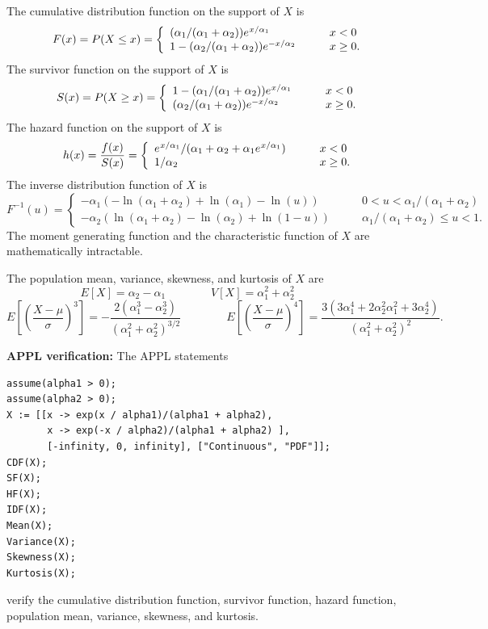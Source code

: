 \documentclass[12pt,fullpage]{article}
\begin{document}
\noindent
The cumulative distribution function on
the support of $X$ is
$$
F(x) = P (X \leq x) = \left\{ \begin{array}{ll}
(\alpha_1/(\alpha_1 + \alpha_2))e^{\kern 0.04em x/\alpha_1} & \qquad x < 0 \\
1 - (\alpha_2/(\alpha_1 + \alpha_2))e^{-x/\alpha_2} & \qquad x \geq 0.
\end{array}
\right.
$$
The survivor function on the support of $X$ is
$$
S(x) = P (X \geq x) = \left\{ \begin{array}{ll}
1 - (\alpha_1/(\alpha_1 + \alpha_2))e^{\kern 0.04em x/\alpha_1} & \qquad x < 0 \\
(\alpha_2/(\alpha_1 + \alpha_2))e^{-x/\alpha_2} & \qquad x \geq 0.
\end{array}
\right.
$$
The hazard function on the support of $X$ is
$$
h(x) = \frac{f(x)}{S(x)} = \left\{ \begin{array}{ll}
e^{\kern 0.04em x/\alpha_1}/(\alpha_1 + \alpha_2 + \alpha_1 e^{\kern 0.04em x/\alpha_1}) & \qquad x < 0 \\
1/\alpha_2 & \qquad x \geq 0.
\end{array}
\right.
$$
The inverse distribution function of $X$ is
$$
F ^ {-1}(u) = \left\{ \begin{array}{ll}
-\alpha_1\left(-\ln(\alpha_1 + \alpha_2) + \ln(\alpha_1) - \ln(u)\right) & \qquad 0 < u < \alpha_1/(\alpha_1 + \alpha_2) \\
-\alpha_2\left(\ln(\alpha_1 + \alpha_2) - \ln(\alpha_2) + \ln(1 - u)\right) & \qquad \alpha_1/(\alpha_1 + \alpha_2) \leq u < 1.
\end{array}
\right.
$$
The moment generating function and the characteristic function of $X$ are mathematically intractable.

\vspace{0.1in}
\noindent
The population mean, variance, skewness, and kurtosis of $X$ are
$$
E[X] = \alpha_2 - \alpha_1 \qquad \qquad 
V[X] = \alpha_1^2 + \alpha_2^2 \qquad \qquad
$$
$$
E\left[ \left( \frac{X - \mu}{\sigma} \right)^3 \right] = - \frac{2(\alpha_1^3 - \alpha_2^3)}{(\alpha_1^2 + \alpha_2^2)^{3/2}}  \qquad \qquad
E\left[ \left( \frac{X - \mu}{\sigma} \right)^4 \right] = \frac{3(3\alpha_1^4 + 2\alpha_2^2 \alpha_1^2 + 3\alpha_2^4)}{(\alpha_1^2 + \alpha_2^2)^2}.
$$

\vspace{0.1in}

\noindent
{\bf APPL verification:}
The APPL statements
\begin{verbatim}
assume(alpha1 > 0);
assume(alpha2 > 0);
X := [[x -> exp(x / alpha1)/(alpha1 + alpha2),
       x -> exp(-x / alpha2)/(alpha1 + alpha2) ],
       [-infinity, 0, infinity], ["Continuous", "PDF"]]; 
CDF(X);
SF(X);
HF(X);
IDF(X);
Mean(X);
Variance(X);
Skewness(X);
Kurtosis(X);
\end{verbatim}
verify the cumulative distribution function, survivor function, hazard function, population mean, variance, skewness, and kurtosis.
\end{document}
